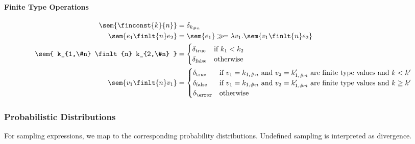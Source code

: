 \paragraph{Finite Type Operations}
\begin{align*}
\sem{ \finconst{k}{n} } &= \delta_{k_{\#n}} \\
%
\sem{ e_1 \finlt{n} e_2 } &= \sem{ e_1 } \gg\!= \lambda v_1. \sem{ v_1 \finlt{n} e_2 } \\
%
\sem{ k_{1,\#n} \finlt{n} k_{2,\#n} } &= \begin{cases}
    \delta_{\text{true}} & \text{if } k_1 < k_2 \\
    \delta_{\text{false}} & \text{otherwise}
\end{cases} \\
%
\sem{ v_1 \finlt{n} v_1 } &= \begin{cases}
	\delta_{\text{true}} & \text{if $v_1 = k_{1,\#n}$ and $v_2 = k_{1,\#n}'$ are finite type values and}~k < k' \\
	\delta_{\text{false}} & \text{if $v_1 = k_{1,\#n}$ and $v_2 = k_{1,\#n}'$ are finite type values and}~k \geq k' \\
	\delta_{\error} & \text{otherwise}
\end{cases}
\end{align*}

\subsubsection{Probabilistic Distributions}

For sampling expressions, we map to the corresponding probability distributions. Undefined sampling is interpreted as divergence. 

